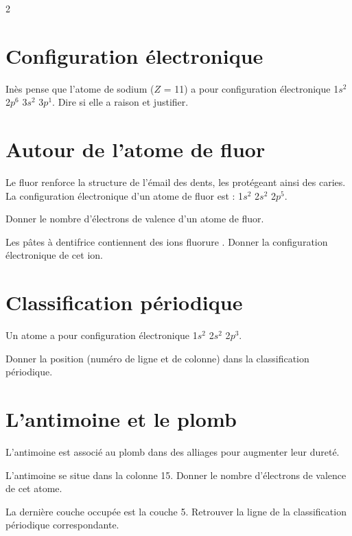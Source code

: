 \documentclass[a4paper,11pt,fleqn]{scrartcl}%
\begin{document}
	\maketitle

\begin{multicols}{2}
\section{Configuration électronique}
Inès pense que l'atome de sodium  ($Z$ = 11) a pour configuration électronique 1$s^2$ 2$p^6$ 3$s^2$ 3$p^1$. Dire si elle a raison et justifier.

\section{Autour de l'atome de fluor}
Le fluor renforce la structure de l'émail des dents, les protégeant ainsi des caries. La configuration
électronique d'un atome de fluor est : 1$s^2$ 2$s^2$ 2$p^5$.
	\begin{itemize*}
		\item Donner le nombre d'électrons de valence d'un atome de fluor.
		\item Les pâtes à dentifrice contiennent des ions fluorure . Donner la configuration électronique de cet ion.
	\end{itemize*}

\section{Classification périodique}
Un atome a pour configuration électronique  1$s^2$ 2$s^2$ 2$p^3$.
	\begin{itemize*}
		\item Donner la position (numéro de ligne et de colonne) dans la classification périodique.
	\end{itemize*}

\section{L'antimoine et le plomb}
L'antimoine est associé au plomb dans des alliages pour augmenter leur dureté.
	\begin{itemize*}
		\item L'antimoine se situe dans la colonne 15. Donner le nombre d'électrons de valence de cet atome.
		\item La dernière couche occupée est la couche 5. Retrouver la ligne de la classification périodique correspondante.
	\end{itemize*}


\end{multicols}
\end{document}

